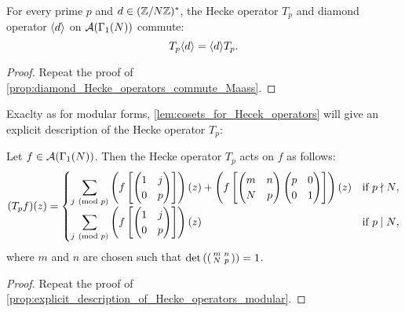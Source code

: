       \begin{proposition}\label{prop:diamond_Hecke_operators_commute_Maass}
        For every prime $p$ and $d \in (\mathbb{Z}/N\mathbb{Z})^{\ast}$, the Hecke operator $T_{p}$ and diamond operator $\langle d\rangle$ on $\mathcal{A}(\Gamma_{1}(N))$ commute:
        \[
          T_{p}\langle d\rangle = \langle d\rangle T_{p}.
        \]
      \end{proposition}
      \begin{proof}
        Repeat the proof of \cref{prop:diamond_Hecke_operators_commute_Maass}.
      \end{proof}

      Exaclty as for modular forms, \cref{lem:cosets_for_Hecek_operators} will give an explicit description of the Hecke operator $T_{p}$:

      \begin{proposition}\label{prop:explicit_description_of_Hecke_operators_Maass}
        Let $f \in \mathcal{A}(\Gamma_{1}(N))$. Then the Hecke operator $T_{p}$ acts on $f$ as follows:
        \[
          (T_{p}f)(z) = \begin{cases} \displaystyle{\sum_{j \ \left(\text{mod }p\right)}}\left(f\left[\begin{pmatrix} 1 & j \\ 0 & p \end{pmatrix}\right]\right)(z)+\left(f\left[\begin{pmatrix} m & n \\ N & p \end{pmatrix}\begin{pmatrix} p & 0 \\ 0 & 1 \end{pmatrix}\right]\right)(z) & \text{if $p \nmid N$}, \\ \displaystyle{\sum_{j \ \left(\text{mod }p\right)}}\left(f\left[\begin{pmatrix} 1 & j \\ 0 & p \end{pmatrix}\right]\right)(z) & \text{if $p \mid N$}, \end{cases}
        \]
        where $m$ and $n$ are chosen such that $\det\left(\begin{psmallmatrix} m & n \\ N & p \end{psmallmatrix}\right) = 1$.
      \end{proposition}
      \begin{proof}
        Repeat the proof of \cref{prop:explicit_description_of_Hecke_operators_modular}.
      \end{proof}

